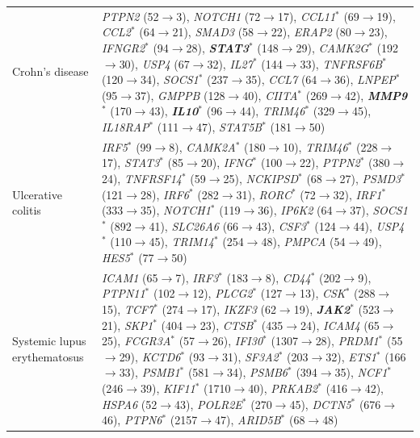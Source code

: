 \begin{table}[!htbp]
\begin{tabular*}{\linewidth}{@{\extracolsep{\fill}}p{}>{\raggedright\arraybackslash}p{}}
Crohn's disease & \textit{PTPN2} (52$\rightarrow$3), \textit{NOTCH1} (72$\rightarrow$17), \textit{CCL11}$^\ast$ (69$\rightarrow$19), \textit{CCL2}$^\ast$ (64$\rightarrow$21), \textit{SMAD3} (58$\rightarrow$22), \textit{ERAP2} (80$\rightarrow$23), \textit{IFNGR2}$^\ast$ (94$\rightarrow$28), \textbf{\textit{STAT3}}$^\ast$ (148$\rightarrow$29), \textit{CAMK2G}$^\ast$ (192$\rightarrow$30), \textit{USP4} (67$\rightarrow$32), \textit{IL27}$^\ast$ (144$\rightarrow$33), \textit{TNFRSF6B}$^\ast$ (120$\rightarrow$34), \textit{SOCS1}$^\ast$ (237$\rightarrow$35), \textit{CCL7} (64$\rightarrow$36), \textit{LNPEP}$^\ast$ (95$\rightarrow$37), \textit{GMPPB} (128$\rightarrow$40), \textit{CIITA}$^\ast$ (269$\rightarrow$42), \textbf{\textit{MMP9}}$^\ast$ (170$\rightarrow$43), \textbf{\textit{IL10}}$^\ast$ (96$\rightarrow$44), \textit{TRIM46}$^\ast$ (329$\rightarrow$45), \textit{IL18RAP}$^\ast$ (111$\rightarrow$47), \textit{STAT5B}$^\ast$ (181$\rightarrow$50) \\
Ulcerative colitis & \textit{IRF5}$^\ast$ (99$\rightarrow$8), \textit{CAMK2A}$^\ast$ (180$\rightarrow$10), \textit{TRIM46}$^\ast$ (228$\rightarrow$17), \textit{STAT3}$^\ast$ (85$\rightarrow$20), \textit{IFNG}$^\ast$ (100$\rightarrow$22), \textit{PTPN2}$^\ast$ (380$\rightarrow$24), \textit{TNFRSF14}$^\ast$ (59$\rightarrow$25), \textit{NCKIPSD}$^\ast$ (68$\rightarrow$27), \textit{PSMD3}$^\ast$ (121$\rightarrow$28), \textit{IRF6}$^\ast$ (282$\rightarrow$31), \textit{RORC}$^\ast$ (72$\rightarrow$32), \textit{IRF1}$^\ast$ (333$\rightarrow$35), \textit{NOTCH1}$^\ast$ (119$\rightarrow$36), \textit{IP6K2} (64$\rightarrow$37), \textit{SOCS1}$^\ast$ (892$\rightarrow$41), \textit{SLC26A6} (66$\rightarrow$43), \textit{CSF3}$^\ast$ (124$\rightarrow$44), \textit{USP4}$^\ast$ (110$\rightarrow$45), \textit{TRIM14}$^\ast$ (254$\rightarrow$48), \textit{PMPCA} (54$\rightarrow$49), \textit{HES5}$^\ast$ (77$\rightarrow$50) \\
Systemic lupus erythematosus & \textit{ICAM1} (65$\rightarrow$7), \textit{IRF3}$^\ast$ (183$\rightarrow$8), \textit{CD44}$^\ast$ (202$\rightarrow$9), \textit{PTPN11}$^\ast$ (102$\rightarrow$12), \textit{PLCG2}$^\ast$ (127$\rightarrow$13), \textit{CSK}$^\ast$ (288$\rightarrow$15), \textit{TCF7}$^\ast$ (274$\rightarrow$17), \textit{IKZF3} (62$\rightarrow$19), \textbf{\textit{JAK2}}$^\ast$ (523$\rightarrow$21), \textit{SKP1}$^\ast$ (404$\rightarrow$23), \textit{CTSB}$^\ast$ (435$\rightarrow$24), \textit{ICAM4} (65$\rightarrow$25), \textit{FCGR3A}$^\ast$ (57$\rightarrow$26), \textit{IFI30}$^\ast$ (1307$\rightarrow$28), \textit{PRDM1}$^\ast$ (55$\rightarrow$29), \textit{KCTD6}$^\ast$ (93$\rightarrow$31), \textit{SF3A2}$^\ast$ (203$\rightarrow$32), \textit{ETS1}$^\ast$ (166$\rightarrow$33), \textit{PSMB1}$^\ast$ (581$\rightarrow$34), \textit{PSMB6}$^\ast$ (394$\rightarrow$35), \textit{NCF1}$^\ast$ (246$\rightarrow$39), \textit{KIF11}$^\ast$ (1710$\rightarrow$40), \textit{PRKAB2}$^\ast$ (416$\rightarrow$42), \textit{HSPA6} (52$\rightarrow$43), \textit{POLR2E}$^\ast$ (270$\rightarrow$45), \textit{DCTN5}$^\ast$ (676$\rightarrow$46), \textit{PTPN6}$^\ast$ (2157$\rightarrow$47), \textit{ARID5B}$^\ast$ (68$\rightarrow$48) \\

\end{tabular*}
\end{table}
